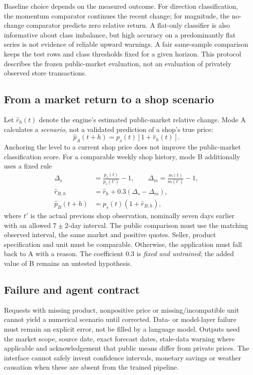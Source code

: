 \documentclass[conference]{IEEEtran}
\begin{document}
Baseline choice depends on the measured outcome. For direction classification, the momentum comparator continues the recent change; for magnitude, the no-change comparator predicts zero relative return. A flat-only classifier is also informative about class imbalance, but high accuracy on a predominantly flat series is not evidence of reliable upward warnings. A fair same-sample comparison keeps the test rows and class thresholds fixed for a given horizon. This protocol describes the frozen public-market evaluation, not an evaluation of privately observed store transactions.

\subsection{From a market return to a shop scenario}
Let $\widehat r_h(t)$ denote the engine's estimated public-market relative change. Mode A calculates a \emph{scenario}, not a validated prediction of a shop's true price:
\begin{equation}
\widehat p_A(t+h)=p_s(t)\left[1+\widehat r_h(t)\right].
\label{eq:a}
\end{equation}
Anchoring the level to a current shop price does not improve the public-market classification score. For a comparable weekly shop history, mode B additionally uses a fixed rule
\begin{align}
\Delta_s&=\frac{p_s(t)}{p_s(t')}-1, \qquad \Delta_m=\frac{m(t)}{m(t')}-1,\\
\widehat r_{B,h}&=\widehat r_h+0.3(\Delta_s-\Delta_m),\\
\widehat p_B(t+h)&=p_s(t)(1+\widehat r_{B,h}),
\end{align}
where $t'$ is the actual previous shop observation, nominally seven days earlier with an allowed $7\pm2$-day interval. The public comparison must use the matching observed interval, the same market and positive quotes. Seller, product specification and unit must be comparable. Otherwise, the application must fall back to A with a reason. The coefficient $0.3$ is \emph{fixed and untrained}; the added value of B remains an untested hypothesis.

\subsection{Failure and agent contract}
Requests with missing product, nonpositive price or missing/incompatible unit cannot yield a numerical scenario until corrected. Data- or model-layer failure must remain an explicit error, not be filled by a language model. Outputs need the market scope, source date, exact forecast dates, stale-data warning where applicable and acknowledgement that public means differ from private prices. The interface cannot safely invent confidence intervals, monetary savings or weather causation when these are absent from the trained pipeline.
\end{document}
